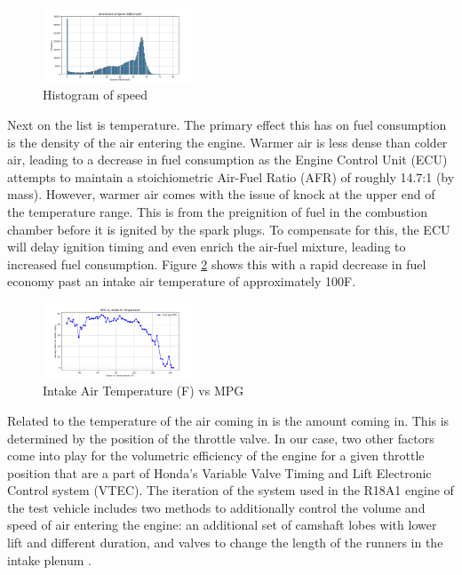 \documentclass[letterpaper]{article}
\begin{document}
\begin{figure}[htbp]
    \centering
    \includegraphics[width=0.4\textwidth]{figures/histogram_speedobdmph.png}
    \caption{Histogram of speed}
    \label{fig:histmpgspeed}
\end{figure}

Next on the list is temperature. The primary effect this has on fuel 
consumption is the density of the air entering the engine. Warmer air is 
less dense than colder air, leading to a decrease in fuel consumption as 
the Engine Control Unit (ECU) attempts to maintain a stoichiometric 
Air-Fuel Ratio (AFR) of roughly 14.7:1 (by mass). However, warmer air 
comes with the issue of knock at the upper end of the temperature range. 
This is from the preignition of fuel in the combustion chamber before it 
is ignited by the spark plugs. To compensate for this, the ECU will delay 
ignition timing and even enrich the air-fuel mixture, leading to increased 
fuel consumption. Figure \ref{fig:intakeairtempmpg} shows this with a rapid 
decrease in fuel  economy past an intake air temperature of approximately 
100\textdegree F.

\begin{figure}[htbp]
    \centering
    \includegraphics[width=0.4\textwidth]{figures/intake_air_temp_mpg.png}
    \caption{Intake Air Temperature (\textdegree F) vs MPG}
    \label{fig:intakeairtempmpg}
\end{figure}

Related to the temperature of the air coming in is the amount coming in. 
This is determined by the position of the throttle valve. In our case, two 
other factors come into play for the volumetric efficiency of the engine 
for a given throttle position that are a part of Honda's Variable Valve 
Timing and Lift Electronic Control system (VTEC). The iteration of the 
system used in the R18A1 engine of the test vehicle includes two methods 
to additionally control the volume and speed of air entering the engine: 
an additional set of camshaft lobes with lower lift and different 
duration, and valves to change the length of the runners in the intake 
plenum \cite{Bandgar2024}. 
\end{document}
